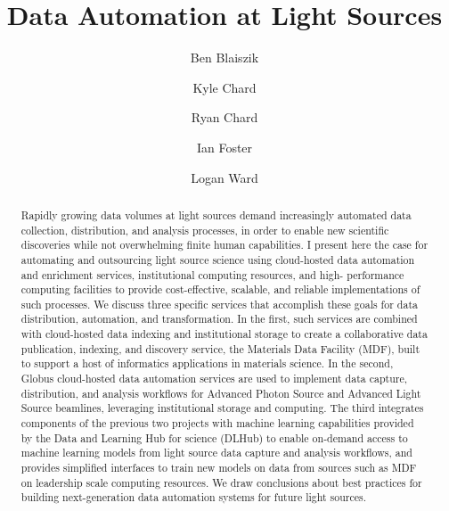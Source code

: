 \documentclass{aip-cp}
\begin{document}
\title{Data Automation at Light Sources}

\author[aff1]{Ben Blaiszik}
\author[aff1]{Kyle Chard}
\author[aff1]{Ryan Chard}
\author[aff1,aff2]{Ian Foster}
\author[aff1]{Logan Ward}


\maketitle


\begin{abstract}
Rapidly growing data volumes at light sources demand increasingly automated data collection, 
distribution, and analysis processes, in order to enable new scientific discoveries while not 
overwhelming finite human capabilities. I present here the case for automating and outsourcing 
light source science using cloud-hosted data automation and enrichment services, institutional 
computing resources, and high- performance computing facilities to provide cost-effective, scalable, 
and reliable implementations of such processes. We discuss three specific services that accomplish 
these goals for data distribution, automation, and transformation. In the first, such services are 
combined with cloud-hosted data indexing and institutional storage to create a 
collaborative data publication, indexing, and discovery service, the Materials Data Facility (MDF), 
built to support a host of informatics applications in materials science. In the second,  
Globus cloud-hosted data automation services are used to implement data capture, distribution, and 
analysis workflows for Advanced Photon Source and Advanced Light Source beamlines, leveraging 
institutional storage and computing. The third integrates 
components of the previous two projects with machine learning capabilities provided by the Data and 
Learning Hub for science (DLHub) to enable on-demand access to machine learning models from light 
source data capture and analysis workflows, and provides simplified interfaces to train new models 
on data from sources such as MDF on leadership scale computing resources. We draw conclusions about 
best practices for building next-generation data automation systems for future light sources.
\end{abstract}
\end{document}
